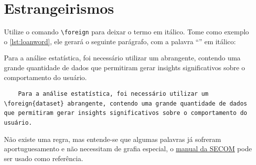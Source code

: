 \begin{table}[htb]
  \begin{center}
  \end{center}
\end{table}

\section{Estrangeirismos}

Utilize o comando \texttt{\textbackslash{}foreign} para deixar o termo em itálico. Tome como exemplo o \autoref{lst:loanword}, ele gerará o seguinte parágrafo, com a palavra \enquote{\dataset} em itálico:

Para a análise estatística, foi necessário utilizar um  abrangente, contendo uma grande quantidade de dados que permitiram gerar insights significativos sobre o comportamento do usuário.

\begin{listing}[htb]
  \begin{verbatim}
    Para a análise estatística, foi necessário utilizar um \foreign{dataset} abrangente, contendo uma grande quantidade de dados que permitiram gerar insights significativos sobre o comportamento do usuário.
  \end{verbatim}
  \caption{Estrangeirismos}
  \label{lst:loanword}
\end{listing}

Não existe uma regra, mas entende-se que algumas palavras já sofreram aportuguesamento e não necessitam de grafia especial, o \href{https://www12.senado.leg.br/manualdecomunicacao/verbetes-acessorio/estrangeirismos-grafados-sem-italico-ou-aspas}{manual da SECOM} pode ser usado como referência.
